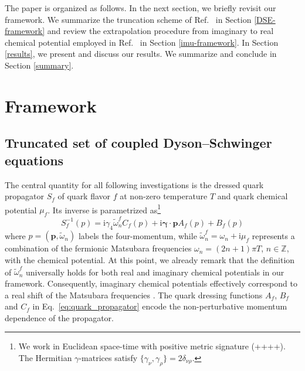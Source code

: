 \documentclass[%
    aps,
    prd,
    reprint,
    superscriptaddress,
    floatfix,
    nofootinbib,
    noamsmath,
    noamssymb
]{revtex4-2}
\renewcommand*{\vec}[1]{\bm{#1}}
\newcommand*{\+}{\hspace*{.08335em}}
\newcommand*{\?}{\hspace*{-.08335em}}
\newcommand*{\ii}{\mathrm{i}}
\newcommand*{\bbZ}{\mathbb{Z}}
\begin{document}
The paper is organized as follows. In the next section, we briefly revisit our
framework. We summarize the truncation scheme of Ref.~\cite{Gunkel:2021oya} in
Section \ref{DSE-framework} and review the extrapolation procedure from
imaginary to real chemical potential employed in Ref.~\cite{Borsanyi:2020fev} in
Section \ref{imu-framework}. In Section \ref{results}, we present and discuss
our results. We summarize and conclude in Section \ref{summary}.


\section{\label{framework}%
    Framework
}

\subsection{\label{DSE-framework}%
	Truncated set of coupled Dyson--Schwinger equations
}

The central quantity for all following investigations is the dressed quark
propagator $S_{f}$ of quark flavor $f$ at non-zero temperature $T$ and quark
chemical potential $\mu_{f}$. Its inverse is parametrized as\footnote{%
    We work in Euclidean space-time with positive metric signature (++++). The
    Hermitian $\gamma$-matrices satisfy $\{\gamma_{\nu}, \gamma_{\rho}\} = 2
    \delta_{\nu \rho}$.%
}%
\begin{equation}
    \label{eq:quark_propagator}
    S_{f}^{-1}(p)
    =
    \ii \gamma_{4} \tilde{\omega}_{n}^{f} C_{f}(p)
    +
    \ii \vec{\gamma} \cdot \vec{p} A_{f}(p)
    +
    B_{f}(p)
\end{equation}
where $p = (\vec{p}, \tilde{\omega}_{n})$ labels the four-momentum, while
$\tilde{\omega}_{n}^{f} = \omega_{n} + \ii \mu_{f}$ represents a combination of
the fermionic Matsubara frequencies $\omega_{n} = (2n + 1) \pi T$, $n \in \bbZ$,
with the chemical potential. At this point, we already remark that the
definition of $\tilde{\omega}_{n}^{f}$ universally holds for both real and
imaginary chemical potentials in our framework. Consequently, imaginary chemical
potentials effectively correspond to a real shift of the Matsubara frequencies
\cite{Braun:2009gm,Fischer:2014vxa}. The quark dressing functions $A_{f}$,
$B_{f}$ and $C_{f}$ in Eq.~\eqref{eq:quark_propagator} encode the
non-perturbative momentum dependence of the propagator.
\end{document}
